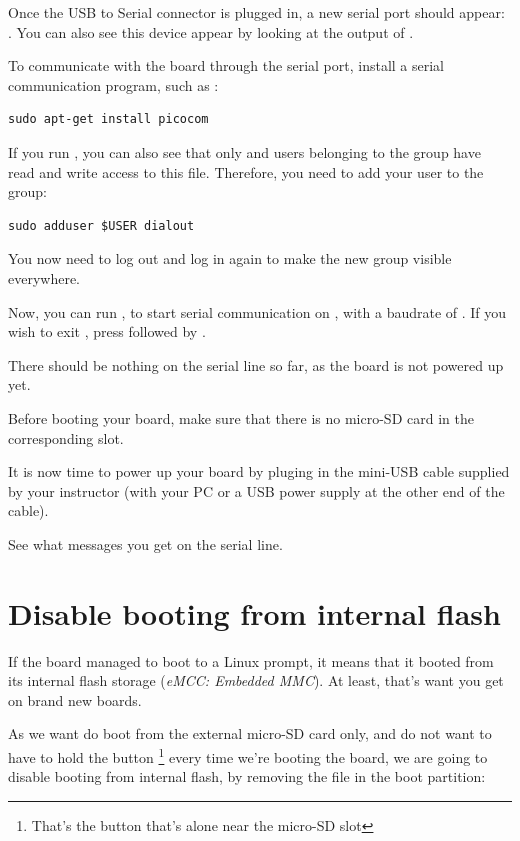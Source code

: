 Once the USB to Serial connector is plugged in, a new serial port
should appear: .  You can also see this device
appear by looking at the output of .

To communicate with the board through the serial port, install a
serial communication program, such as :

\begin{verbatim}
sudo apt-get install picocom
\end{verbatim}

If you run , you can also see that only
 and users belonging to the  group have
read and write access to this file. Therefore, you need to add your user
to the  group:

\begin{verbatim}
sudo adduser $USER dialout
\end{verbatim}

You now need to log out and log in again to make the new group
visible everywhere.

Now, you can run , to start serial
communication on , with a baudrate of . If
you wish to exit , press \code{[Ctrl][a]} followed by
\code{[Ctrl][x]}.

There should be nothing on the serial line so far, as the board is not
powered up yet.

Before booting your board, make sure that there is no micro-SD card
in the corresponding slot.

It is now time to power up your board by pluging in the mini-USB
cable supplied by your instructor (with your PC or a USB power supply at the
other end of the cable).

See what messages you get on the serial line.

\section{Disable booting from internal flash}

If the board managed to boot to a Linux prompt, it means that 
it booted from its internal flash storage ({\em eMCC: Embedded MMC}).
At least, that's want you get on brand new boards.

As we want do boot from the external micro-SD card only,
and do not want to have to hold the  button \footnote{That's
the button that's alone near the micro-SD slot} every time we're booting
the board, we are going to disable booting from internal flash, by
removing the  file in the boot partition:  

